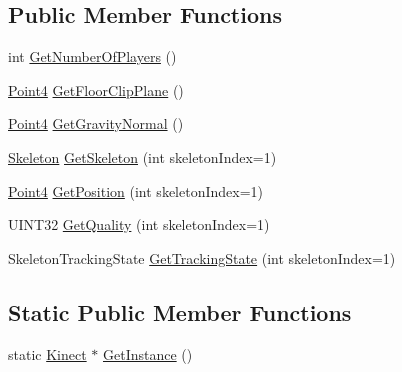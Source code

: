 \subsection*{Public Member Functions}
\begin{DoxyCompactItemize}
\item 
int \hyperlink{classKinect_a2f709c6f1d7494235f1eaa066af57deb}{GetNumberOfPlayers} ()
\item 
\hyperlink{structKinect_1_1Point4}{Point4} \hyperlink{classKinect_a74626e0a9f23f6ade0870f317f46741d}{GetFloorClipPlane} ()
\item 
\hyperlink{structKinect_1_1Point4}{Point4} \hyperlink{classKinect_a9407fbe9ee738a179433febea23e17f3}{GetGravityNormal} ()
\item 
\hyperlink{classSkeleton}{Skeleton} \hyperlink{classKinect_aaa9c26d0c72101a1d34b595fe8d10cb1}{GetSkeleton} (int skeletonIndex=1)
\item 
\hyperlink{structKinect_1_1Point4}{Point4} \hyperlink{classKinect_a78938e42badb920ae502cc93acd801bf}{GetPosition} (int skeletonIndex=1)
\item 
UINT32 \hyperlink{classKinect_a2c5e3c65262756c8bdc46ccbd02dda2d}{GetQuality} (int skeletonIndex=1)
\item 
SkeletonTrackingState \hyperlink{classKinect_ad86ca99d266837111b537b52325ec675}{GetTrackingState} (int skeletonIndex=1)
\end{DoxyCompactItemize}
\subsection*{Static Public Member Functions}
\begin{DoxyCompactItemize}
\item 
static \hyperlink{classKinect}{Kinect} $\ast$ \hyperlink{classKinect_a84cf4659d277e426684b4232266da03a}{GetInstance} ()
\end{DoxyCompactItemize}


